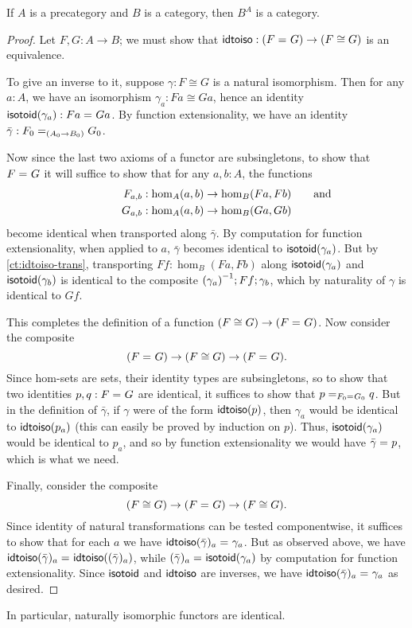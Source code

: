 \begin{thm}\label{ct:functor-cat}
  If $A$ is a precategory and $B$ is a category, then $B^A$ is a category.
\end{thm}
\begin{proof}
  Let $F,G:A\to B$; we must show that $\idtoiso:(\id{F}{G}) \to (F\cong G)$ is an equivalence.

  To give an inverse to it, suppose $\gamma:F\cong G$ is a natural isomorphism.  Then for any $a:A$, we have an isomorphism $\gamma_a:Fa \cong Ga$, hence an identity $\isotoid(\gamma_a):\id{Fa}{Ga}$.  By function extensionality, we have an identity $\bar{\gamma}:\id[(A_0\to B_0)]{F_0}{G_0}$.

  Now since the last two axioms of a functor are subsingletons, to show that $\id{F}{G}$ it will suffice to show that for any $a,b:A$, the functions
  \begin{align*}
    F_{a,b}&:\hom_A(a,b) \to \hom_B(Fa,Fb)\mathrlap{\qquad\text{and}}\\
    G_{a,b}&:\hom_A(a,b) \to \hom_B(Ga,Gb)
  \end{align*}
  become identical when transported along $\bar\gamma$.  By computation for function extensionality, when applied to $a$, $\bar\gamma$ becomes identical to $\isotoid(\gamma_a)$.  But by \autoref{ct:idtoiso-trans}, transporting $Ff:\hom_B(Fa,Fb)$ along $\isotoid(\gamma_a)$ and $\isotoid(\gamma_b)$ is identical to the composite $\inv{(\gamma_a)};Ff;\gamma_b$, which by naturality of $\gamma$ is identical to $Gf$.

  This completes the definition of a function $(F\cong G) \to (\id F G)$.  Now consider the composite
  \[ (\id F G) \to (F\cong G) \to (\id F G). \]
  Since hom-sets are sets, their identity types are subsingletons, so to show that two identities $p,q:\id F G$ are identical, it suffices to show that $\id[\id{F_0}{G_0}]{p}{q}$.
  But in the definition of $\bar\gamma$, if $\gamma$ were of the form $\idtoiso(p)$, then $\gamma_a$ would be identical to $\idtoiso(p_a)$ (this can easily be proved by induction on $p$).
  Thus, $\isotoid(\gamma_a)$ would be identical to $p_a$, and so by function extensionality we would have $\id{\bar\gamma}{p}$, which is what we need.

  Finally, consider the composite
  \[(F\cong G)\to  (\id F G) \to (F\cong G). \]
  Since identity of natural transformations can be tested componentwise, it suffices to show that for each $a$ we have $\id{\idtoiso(\bar\gamma)_a}{\gamma_a}$.  But as observed above, we have $\id{\idtoiso(\bar\gamma)_a}{\idtoiso((\bar\gamma)_a)}$, while $\id{(\bar\gamma)_a}{\isotoid(\gamma_a)}$ by computation for function extensionality.  Since $\isotoid$ and $\idtoiso$ are inverses, we have $\id{\idtoiso(\bar\gamma)_a}{\gamma_a}$ as desired.
\end{proof}

In particular, naturally isomorphic functors are identical.



